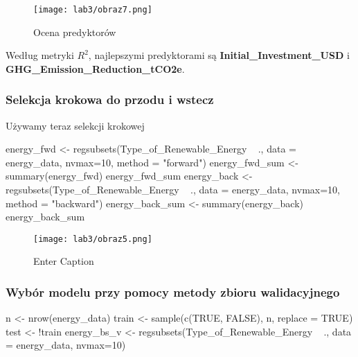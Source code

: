 \begin{figure}[H]
    \centering
    \texttt{[image: lab3/obraz7.png]}
    \caption{Ocena predyktorów}
    \label{fig:enter-label}
\end{figure}

Według metryki $R^2$, najlepszymi predyktorami są \textbf{Initial\_Investment\_USD} i \textbf{GHG\_Emission\_Reduction\_tCO2e}.

\subsubsection{Selekcja krokowa do przodu i wstecz}
Używamy teraz selekcji krokowej

\begin{Rcode}
energy_fwd <- regsubsets(Type_of_Renewable_Energy ~ ., data = energy_data, nvmax=10, 
                          method = "forward")
energy_fwd_sum <- summary(energy_fwd)
energy_fwd_sum
energy_back <- regsubsets(Type_of_Renewable_Energy ~ ., data = energy_data, nvmax=10, 
                          method = "backward")
energy_back_sum <- summary(energy_back)
energy_back_sum
\end{Rcode}

\begin{figure}[H]
    \centering
    \texttt{[image: lab3/obraz5.png]}
    \caption{Enter Caption}
    \label{fig:enter-label}
\end{figure}

\subsubsection{Wybór modelu przy pomocy metody zbioru walidacyjnego}

\begin{Rcode}
n <- nrow(energy_data)
train <- sample(c(TRUE, FALSE), n, replace = TRUE)
test <- !train
energy_bs_v <- regsubsets(Type_of_Renewable_Energy ~ ., data = energy_data, nvmax=10)
\end{Rcode}



